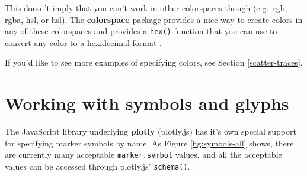 \documentclass[
  12pt,
]{krantz}
\newenvironment{Shaded}{\begin{snugshade}}{\end{snugshade}}
\newcommand{\DataTypeTok}[1]{\textcolor[rgb]{0.13,0.29,0.53}{#1}}
\newcommand{\DecValTok}[1]{\textcolor[rgb]{0.00,0.00,0.81}{#1}}
\newcommand{\FloatTok}[1]{\textcolor[rgb]{0.00,0.00,0.81}{#1}}
\newcommand{\KeywordTok}[1]{\textcolor[rgb]{0.13,0.29,0.53}{\textbf{#1}}}
\newcommand{\NormalTok}[1]{#1}
\newcommand{\OperatorTok}[1]{\textcolor[rgb]{0.81,0.36,0.00}{\textbf{#1}}}
\newcommand{\StringTok}[1]{\textcolor[rgb]{0.31,0.60,0.02}{#1}}
\begin{document}
This doesn't imply that you can't work in other colorspaces though (e.g.~rgb, rgba, hsl, or hsl). The \textbf{colorspace} package provides a nice way to create colors in any of these colorspaces and provides a \texttt{hex()} function that you can use to convert any color to a hexidecimal format \citep{colorspace}.

\begin{Shaded}
\end{Shaded}

If you'd like to see more examples of specifying colors, see Section \ref{scatter-traces}.

\hypertarget{working-with-symbols}{%
\chapter{Working with symbols and glyphs}\label{working-with-symbols}}

The JavaScript library underlying \textbf{plotly} (plotly.js) has it's own special support for specifying marker symbols by name. As Figure \ref{fig:symbols-all} shows, there are currently many acceptable \texttt{marker.symbol} values, and all the acceptable values can be accessed through plotly.js' \texttt{schema()}.
\end{document}
